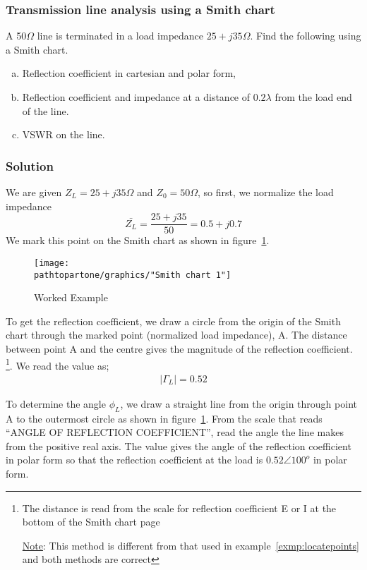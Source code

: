 \begin{exmp}
\subsubsection*{Transmission line analysis using a Smith chart}
A 50$\Omega$ line is terminated in a load impedance $25+j35\Omega$. Find the following using a Smith chart.
\begin{enumerate}[(a)]
\item Reflection coefficient in cartesian and polar form,
\item Reflection coefficient and impedance at a distance of $0.2\lambda$ from the load end of the line.
\item VSWR on the line.
\end{enumerate}

\subsubsection*{Solution}
We are given $Z_{L}=25+j35\varOmega$ and $Z_{0}=50\varOmega$, so first, we normalize the load impedance
\begin{dmath*}
\bar{Z_{L}}=\frac{25+j35}{50}=0.5+j0.7
\end{dmath*}
We mark this point on the Smith chart as shown in figure~\ref{fig:workedexample2}.
\begin{figure}[h]
\centering
\texttt{[image: \\pathtopartone/graphics/"Smith chart 1"]}
\caption{Worked Example}
\label{fig:workedexample2}
\end{figure}

To get the reflection coefficient, we draw a circle from the origin of the Smith chart through the marked point (normalized load impedance), A. The distance between point A and the centre gives the magnitude of the reflection coefficient. \footnote{
The distance is read from the scale for reflection coefficient E or I at the bottom of the Smith chart page

\underline{Note}: This method is different from that used in example~\ref{exmp:locatepoints} and both methods are correct
}. We read the value as;
\begin{align*}
|\Gamma_{L}| = 0.52
\end{align*}

To determine the angle $\phi_{L}$, we draw a straight line from the origin through point A to the outermost circle as shown in figure~\ref{fig:workedexample2}. From the scale that reads \textquotedblleft ANGLE OF REFLECTION COEFFICIENT\textquotedblright\;, read the angle the line makes from the positive real axis. The value gives the angle of the reflection coefficient in polar form so that the reflection coefficient at the load is $0.52\angle100^o$ in polar form.


\end{exmp}
